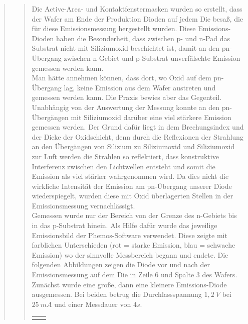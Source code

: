 \begin{quote}
\begin{quote}
        Die Active-Area- und Kontaktfenstermasken wurden so erstellt, dass der
        Wafer am Ende der Produktion Dioden auf jedem Die besaß, die für diese
        Emissionsmessung hergestellt wurden. Diese Emissions-Dioden haben die
        Besonderheit, dass zwischen p- und n-Pad das Substrat nicht mit Siliziumoxid beschichtet
        ist, damit an den pn-Übergang zwischen n-Gebiet und p-Substrat
        unverfälschte Emission gemessen werden kann.\\
        Man hätte annehmen können, dass dort, wo Oxid auf dem pn-Übergang lag,
        keine Emission aus dem Wafer austreten und gemessen werden kann. Die Praxis bewies aber das
        Gegenteil. Unabhängig von der Auswertung der Messung
        konnte an den pn-Übergängen mit Siliziumoxid darüber eine viel stärkere
        Emission gemessen werden. Der Grund dafür liegt in dem Brechungsindex
        und der Dicke der Oxidschicht, denn durch die Reflexionen der Strahlung an
        den Übergängen von Silizium zu Siliziumoxid und Siliziumoxid zur Luft
        werden die Strahlen so reflektiert, dass konstruktive Interferenz
        zwischen den Lichtwellen entsteht und somit die Emission als viel
        stärker wahrgenommen wird. Da dies nicht die wirkliche Intensität der
        Emission am pn-Übergang unserer Diode wiederspiegelt, wurden diese mit
        Oxid überlagerten Stellen in der Emissionsmessung vernachlässigt.\\

        Gemessen wurde nur der Bereich von der Grenze des n-Gebiets bis in
        das p-Substrat hinein. Als Hilfe dafür wurde das jeweilige Emissionsbild
        der Phemos-Software verwendet. Diese zeigte mit farblichen Unterschieden
        (rot = starke Emission, blau = schwache Emission) wo der sinnvolle
        Messbereich begann und endete. Die folgenden Abbildungen zeigen die
        Diode vor und nach der Emissionsmessung auf dem Die in Zeile $6$ und
        Spalte $3$ des Wafers. Zunächst wurde eine große, dann eine kleinere
        Emissions-Diode ausgemessen. Bei beiden betrug die Durchlassspannung
        $1,2\ V$ bei $25\ mA$ und einer Messdauer von $4s$.

         \begin{center}
                \begin{tabular}{ll}

                \hspace{-10em}
                    \begin{minipage}{0.6\textwidth}


\end{minipage}
\end{tabular}
\end{center}
\end{quote}
\end{quote}
